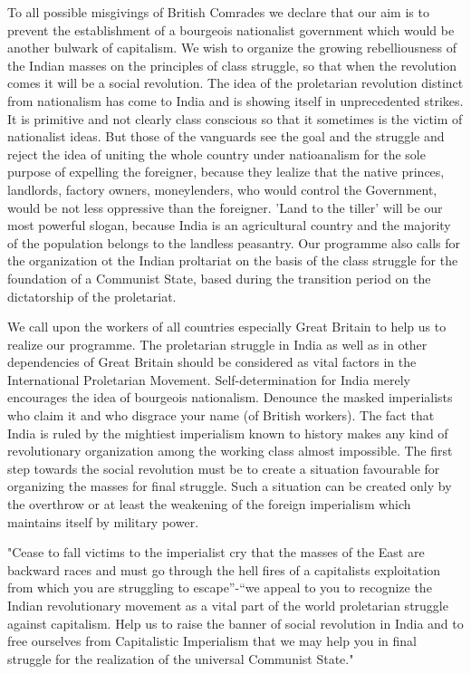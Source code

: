 To all possible misgivings of British Comrades we declare that our aim is to prevent the establishment of a bourgeois nationalist government which would be another bulwark of capitalism. We wish to organize the growing rebelliousness of the Indian masses on the principles of class struggle, so that when the revolution comes it will be a social revolution. The idea of the proletarian revolution distinct from nationalism has come to India and is showing itself in unprecedented strikes. It is primitive and not clearly class conscious so that it sometimes is the victim of nationalist ideas. But those of the vanguards see the goal and the struggle and reject the idea of uniting the whole country under natioanalism for the sole purpose of expelling the foreigner, because they lealize that the native princes, landlords, factory owners, moneylenders, who would control the Government, would be not less oppressive than the foreigner. 'Land to the tiller’ will be our most powerful slogan, because India is an agricultural country and the majority of the population belongs to the landless peasantry. Our programme also calls for the organization ot the Indian proltariat on the basis of the class struggle for the foundation of a Communist State, based during the transition period on the dictatorship of the proletariat. 

We call upon the workers of all countries especially Great Britain to help us to realize our programme. The proletarian struggle in India as well as in other dependencies of Great Britain should be considered as vital factors in the International Proletarian Movement. Self-determination for India merely encourages the idea of bourgeois nationalism. Denounce the masked imperialists who claim it and who disgrace your name (of British workers). The fact that India is ruled by the mightiest imperialism known to history makes any kind of revolutionary organization among the working class almost impossible. The first step towards the social revolution must be to create a situation favourable for organizing the masses for final struggle. Such a situation can be created only by the overthrow or at least the weakening of the foreign imperialism which maintains itself by military power. 

"Cease to fall victims to the imperialist cry that the masses of the East are backward races and must go through the hell fires of a capitalists exploitation from which you are struggling to escape”-“we appeal to you to recognize the Indian revolutionary movement as a vital part of the world proletarian struggle against capitalism. Help us to raise the banner of social revolution in India and to free ourselves from Capitalistic Imperialism that we may help you in final struggle for the realization of the universal Communist State."


